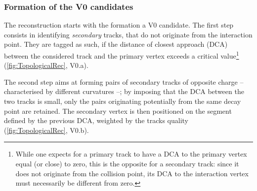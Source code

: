 \subsubsection{Formation of the V0 candidates}
\label{subsubsec:V0Formation}

The reconstruction starts with the formation a V0 candidate. The first step consists in identifying \textit{secondary} tracks, that do not originate from the interaction point. They are tagged as such, if the distance of closest approach (DCA) between the considered track and the primary vertex exceeds a critical value\footnote{While one expects for a primary track to have a DCA to the primary vertex equal (or close) to zero, this is the opposite for a secondary track: since it does not originate from the collision point, its DCA to the interaction vertex must necessarily be different from zero.} (\fig\ref{fig:TopologicalRec}, V0.a). 

The second step aims at forming pairs of secondary tracks of opposite charge -- characterised by different curvatures --; by imposing that the DCA between the two tracks is small, only the pairs originating potentially from the same decay point are retained. The secondary vertex is then positioned on the segment defined by the previous DCA, weighted by the tracks quality (\fig\ref{fig:TopologicalRec}, V0.b).

